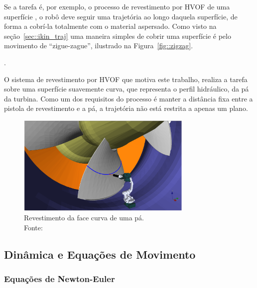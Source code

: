 Se a tarefa é, por exemplo, o processo de revestimento por HVOF de uma
superfície , o robô deve seguir uma trajetória ao longo daquela superfície, de
forma a cobrí-la totalmente com o material aspersado. Como visto na
seção~\ref{sec::ikin_traj} uma maneira simples de cobrir uma superfície é pelo
movimento de ``zigue-zague'', ilustrado
na Figura~\ref{fig::zigzag}.

.

O sistema de revestimento por HVOF que motiva este trabalho, realiza a tarefa
sobre uma superfície suavemente curva, que representa o perfil hidráulico, da pá
da turbina. Como um dos requisitos do processo é manter a distância fixa entre a
pistola de revestimento e a pá, a trajetória não está restrita a apenas um
plano.

\begin{figure}[h]
	\centering 
 	\includegraphics[width=0.75\textwidth]{figs/coat_blade}
 	\caption[Revestimento da face curva de uma pá]{Revestimento da face curva de
 	uma pá. \\Fonte: \citet{8206216}}
 	\label{fig::trajec_600x30}
\end{figure}

\subsection{Dinâmica e Equações de Movimento}

\subsubsection{Equações de Newton-Euler}


